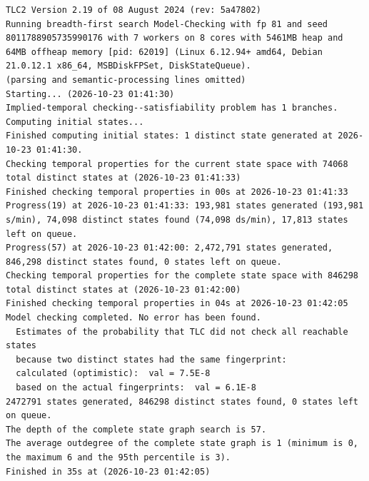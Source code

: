 \documentclass[11pt,a4paper]{article}
\begin{document}
\begin{lstlisting}[float, caption={SaeProvision\_fan.cfg result}, captionpos=t, label={lst:tlc-saeprovision-fan}]
TLC2 Version 2.19 of 08 August 2024 (rev: 5a47802)
Running breadth-first search Model-Checking with fp 81 and seed 8011788905735990176 with 7 workers on 8 cores with 5461MB heap and 64MB offheap memory [pid: 62019] (Linux 6.12.94+ amd64, Debian 21.0.12.1 x86_64, MSBDiskFPSet, DiskStateQueue).
(parsing and semantic-processing lines omitted)
Starting... (2026-10-23 01:41:30)
Implied-temporal checking--satisfiability problem has 1 branches.
Computing initial states...
Finished computing initial states: 1 distinct state generated at 2026-10-23 01:41:30.
Checking temporal properties for the current state space with 74068 total distinct states at (2026-10-23 01:41:33)
Finished checking temporal properties in 00s at 2026-10-23 01:41:33
Progress(19) at 2026-10-23 01:41:33: 193,981 states generated (193,981 s/min), 74,098 distinct states found (74,098 ds/min), 17,813 states left on queue.
Progress(57) at 2026-10-23 01:42:00: 2,472,791 states generated, 846,298 distinct states found, 0 states left on queue.
Checking temporal properties for the complete state space with 846298 total distinct states at (2026-10-23 01:42:00)
Finished checking temporal properties in 04s at 2026-10-23 01:42:05
Model checking completed. No error has been found.
  Estimates of the probability that TLC did not check all reachable states
  because two distinct states had the same fingerprint:
  calculated (optimistic):  val = 7.5E-8
  based on the actual fingerprints:  val = 6.1E-8
2472791 states generated, 846298 distinct states found, 0 states left on queue.
The depth of the complete state graph search is 57.
The average outdegree of the complete state graph is 1 (minimum is 0, the maximum 6 and the 95th percentile is 3).
Finished in 35s at (2026-10-23 01:42:05)
\end{lstlisting}
\bigskip
\end{document}

